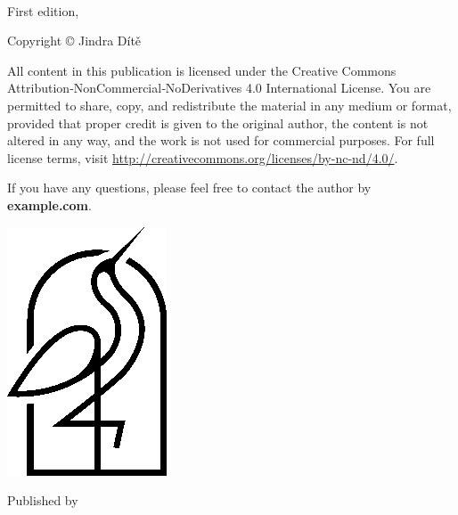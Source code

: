 {\small
\setlength{\parindent}{0em}\setlength{\parskip}{1em}
~
\vfill

First edition, \editionyear{}

Copyright \copyright{} \editionyear{} Jindra Dítě

All content in this publication is licensed under the Creative Commons 
Attribution‑NonCommercial‑NoDerivatives 4.0 International License. You 
are permitted to share, copy, and redistribute the material in any 
medium or format, provided that proper credit is given to the original 
author, the content is not altered in any way, and the work is not used 
for commercial purposes. For full license terms, visit 
\url{http://creativecommons.org/licenses/by-nc-nd/4.0/}.

If you have any questions, please feel free to contact the author by \\ \textbf{example.com}.


\ifx\isbn\undefined\else\if\relax\detokenize\expandafter{\isbn}\relax{}\fi\fi

\includegraphics[width=0.07\linewidth]{frontmatter/logo-black.png}

Published by \publisher{}
}
